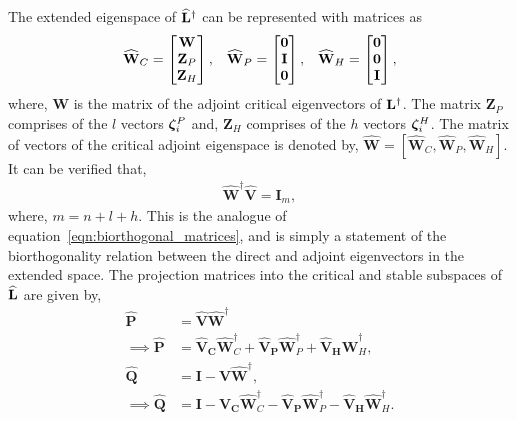 The extended eigenspace of $\mathbf{\widehat{L}}^{\dagger}$ can be represented with matrices as 
\begin{align}
	\mathbf{\widehat{W}}_{C} = \begin{bmatrix}
		\mathbf{W} \\
		\mathbf{Z}_{P} \\
		\mathbf{Z}_{H}
	\end{bmatrix}, &&
	\mathbf{\widehat{W}}_{P} = \begin{bmatrix}
		\boldsymbol{0} \\
		\mathbf{I} \\
		\boldsymbol{0}
	\end{bmatrix}, &&
	\mathbf{\widehat{W}}_{H} = \begin{bmatrix}
		\boldsymbol{0} \\
		\boldsymbol{0} \\
		\mathbf{I}
	\end{bmatrix},
\end{align}
where, $\mathbf{W}$ is the matrix of the adjoint critical eigenvectors of $\mathbf{L}^{\dagger}$. The matrix $\mathbf{Z}_{P}$ comprises of the $l$ vectors $\boldsymbol{\zeta}^{P}_{i}$ and, $\mathbf{Z}_{H}$ comprises of the $h$ vectors $\boldsymbol{\zeta}^{H}_{i}$. The matrix of vectors of the critical adjoint eigenspace is denoted by, $\mathbf{\widehat{W}} = [\mathbf{\widehat{W}}_{C}, \mathbf{\widehat{W}}_{P}, \mathbf{\widehat{W}}_{H}]$. It can be verified that,
\begin{align}
	\label{eqn:extended_biorthogonal_matrices}
	\mathbf{\widehat{W}}^{\dagger}\mathbf{\widehat{V}} = \mathbf{I}_{m}, 
\end{align}
where, $m = n+l+h$. This is the analogue of equation~\eqref{eqn:biorthogonal_matrices}, and is simply a statement of the biorthogonality relation between the direct and adjoint eigenvectors in the extended space. The projection matrices into the critical and stable subspaces of $\mathbf{\widehat{L}}$ are given by,
\begin{align}
	\label{eqn:extended_projectors}
	\mathbf{\widehat{P}} &= \mathbf{\widehat{V}}\mathbf{\widehat{W}}^{\dagger} \\
	\implies \mathbf{\widehat{P}} &= \mathbf{\widehat{V}_{C}}\mathbf{\widehat{W}}^{\dagger}_{C} + \mathbf{\widehat{V}_{P}}\mathbf{\widehat{W}}^{\dagger}_{P} +
	\mathbf{\widehat{V}_{H}}\mathbf{\widehat{W}}^{\dagger}_{H}, \nonumber \\
	\mathbf{\widehat{Q}} &= \mathbf{I} - \mathbf{\widehat{V}}\mathbf{\widehat{W}}^{\dagger}, \\
	\implies \mathbf{\widehat{Q}} &= \mathbf{I} - \mathbf{\widehat{V}_{C}}\mathbf{\widehat{W}}^{\dagger}_{C} - \mathbf{\widehat{V}_{P}}\mathbf{\widehat{W}}^{\dagger}_{P} -
	\mathbf{\widehat{V}_{H}}\mathbf{\widehat{W}}^{\dagger}_{H}. \nonumber
\end{align}


